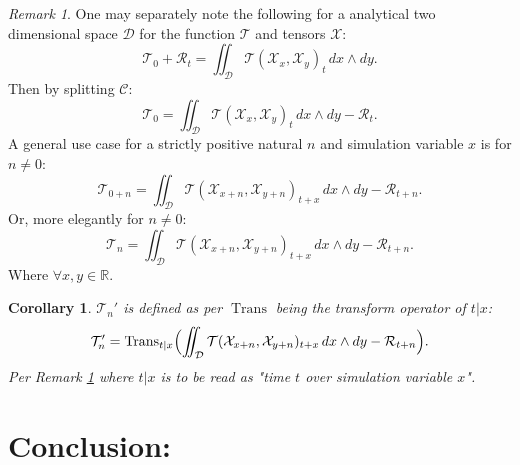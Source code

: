 \documentclass[10pt]{article}
\theoremstyle{plain}
\newtheorem{corollary}[theorem]{Corollary}
\theoremstyle{definition}
\theoremstyle{remark}
\newtheorem{remark}[theorem]{Remark}
\begin{document}
\begin{remark}
\label{rem:math-special-case}
	One may separately note the following for a analytical two dimensional space $\mathcal{D}$ for the function $\mathcal{T}$ and tensors $\mathcal{X}$:
	\begin{equation}
		\mathcal{T}_0 + \mathcal{R}_{t} = \iint_{\mathcal{D}} \mathcal{T}(\mathcal{X}_{x}, \mathcal{X}_{y})_{t} \, dx \land dy.
	\end{equation}
	Then by splitting $\mathcal{C}$:
	\begin{equation}
		\mathcal{T}_0 = \iint_{\mathcal{D}} \mathcal{T}(\mathcal{X}_{x}, \mathcal{X}_{y})_{t} \, dx \land dy - \mathcal{R}_{t}.
	\end{equation}
	A general use case for a strictly positive natural $n$ and simulation variable $x$ is for $n \neq 0$:
	\begin{equation}
		\mathcal{T}_{0+n} = \iint_{\mathcal{D}} \mathcal{T}(\mathcal{X}_{x+n}, \mathcal{X}_{y+n})_{t+x} \, dx \land dy - \mathcal{R}_{t+n}.
	\end{equation}
	Or, more elegantly for $n \neq 0$:
	\begin{equation}
		\mathcal{T}_{n} = \iint_{\mathcal{D}} \mathcal{T}(\mathcal{X}_{x+n}, \mathcal{X}_{y+n})_{t+x} \, dx \land dy - \mathcal{R}_{t+n}.
	\end{equation}
	Where $\forall x, y \in \mathbb{R}$.
\end{remark}

\begin{corollary}
	$\mathcal{T}_{n}'$ is defined as per $\operatorname{Trans}$ being the transform operator of $t|x$:
	\begin{equation}
		\mathcal{T}_{n}' =\operatorname{Trans}_{t|x}\Bigl(\iint_{\mathcal{D}} \mathcal{T}(\mathcal{X}_{x+n}, \mathcal{X}_{y+n})_{t+x} \, dx \land dy - \mathcal{R}_{t+n}\Bigr).
	\end{equation}
	Per Remark \ref{rem:math-special-case} where $t|x$ is to be read as "time $t$ over simulation variable $x$".
\end{corollary}

\section{Conclusion:}

\nocite{*}



\end{document}
